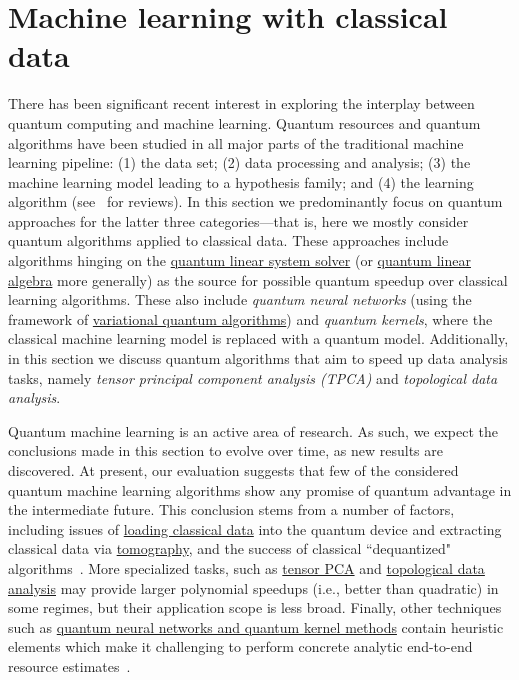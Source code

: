 


\section{Machine learning with classical data }\label{appl:ClassicalML}
\begin{refsection}



There has been significant recent interest in exploring the interplay between quantum computing and machine learning.
Quantum resources and quantum algorithms have been studied in all major parts of the traditional machine learning pipeline: (1) the data set; (2) data processing and analysis; 
(3) the machine learning model leading to a hypothesis family; and (4) the learning algorithm (see~\cite{biamonte2016QuantumMachineLearning, cerezo2022challenges, ciliberto2018QMLReview} for reviews). 
In this section we predominantly focus on quantum approaches for the latter three categories---that is, here we mostly consider quantum algorithms applied to classical data. These approaches include algorithms hinging on the \hyperref[prim:QuantumLinearSystemSolvers]{quantum linear system solver} (or \hyperref[prim:LinearAlgebra]{quantum linear algebra} more generally) as the source for possible quantum speedup over classical learning algorithms. These also include \textit{quantum neural networks} (using the framework of \hyperref[prim:VQA]{variational quantum algorithms}) and \textit{quantum kernels}, where the classical machine learning model is replaced with a quantum model. Additionally, in this section we  discuss quantum algorithms that aim to speed up data analysis tasks, namely \textit{tensor principal component analysis (TPCA)} and \textit{topological data analysis}. 

Quantum machine learning is an active area of research. As such, we expect the conclusions made in this section to evolve over time, as new results are discovered. 
At present, our evaluation suggests that few of the considered quantum machine learning algorithms show any promise of quantum advantage in the intermediate future. This conclusion stems from a number of factors, including issues of \hyperref[prim:LoadingClassicalData]{loading classical data} into the quantum device and extracting classical data via \hyperref[prim:Tomography]{tomography}, and the success of classical ``dequantized" algorithms~\cite{tang2018QuantumInspiredRecommSys}. 
More specialized tasks, such as \hyperref[appl:TPCA]{tensor PCA} and \hyperref[appl:TDA]{topological data analysis} may provide larger polynomial speedups (i.e., better than quadratic) in some regimes, but their application scope is less broad. Finally, other techniques such as \hyperref[appl:NearTermML]{quantum neural networks and quantum kernel methods} contain heuristic elements which make it challenging to perform concrete analytic end-to-end resource estimates~\cite{schuld2022IsQuantumAdvatnage}. 




\localtableofcontents

\printbibliography[heading=secbib,segment=\therefsegment]
\end{refsection}


